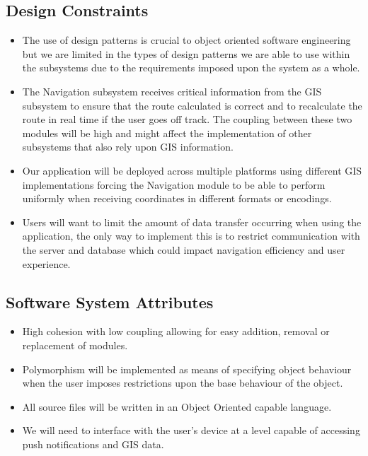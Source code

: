 	\subsection{Design Constraints}
	\begin{itemize}
		\small
		\item The use of design patterns is crucial to object oriented software engineering but we are limited 
			in the types of design patterns we are able to use within the subsystems due to the requirements 
			imposed upon the system as a whole.
		\item The Navigation subsystem receives critical information from the GIS subsystem to ensure that the route
			calculated is correct and to recalculate the route in real time if the user goes off track. The coupling between these two modules will be high and might affect the implementation of other subsystems that also rely upon GIS information.
		\item Our application will be deployed across multiple platforms using different GIS implementations forcing the Navigation module to be able to perform uniformly when receiving coordinates in different formats or encodings.
		\item Users will want to limit the amount of data transfer occurring when using the application, the only way to implement this is to restrict communication with the server and database which could impact navigation efficiency and user experience.
	\end{itemize}
	
	\subsection{Software System Attributes}
	\begin{itemize}
		\small 
		\item High cohesion with low coupling allowing for easy addition, removal or replacement of modules.
		\item Polymorphism will be implemented as means of specifying object behaviour when the user imposes restrictions upon the base behaviour of the object.
		\item All source files will be written in an Object Oriented capable language.
		\item We will need to interface with the user's device at a level capable of accessing push notifications and 
		 GIS data.
	\end{itemize}
	

